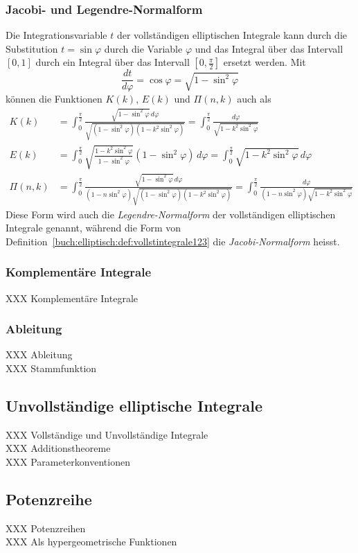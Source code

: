 \subsubsection{Jacobi- und Legendre-Normalform}
Die Integrationsvariable $t$ der vollständigen elliptischen Integrale
kann durch die Substitution $t=\sin\varphi$ durch die Variable
$\varphi$ und das Integral über das Intervall $[0,1]$ durch ein
Integral über das Intervall $[0,\frac{\pi}2]$ ersetzt werden.
Mit
\[
\frac{dt}{d\varphi} = \cos\varphi = \sqrt{1-\sin^2\varphi}
\]
können die Funktionen $K(k)$, $E(k)$ und $\Pi(n,k)$ auch als
\begin{align*}
K(k)
&=
\int_0^{\frac{\pi}2}
\frac{
\sqrt{1-\sin^2\varphi}\,d\varphi
}{
\sqrt{(1-\sin^2\varphi)(1-k^2\sin^2\varphi)}
}
=
\int_0^{\frac{\pi}2}
\frac{d\varphi}{\sqrt{1-k^2\sin^2\varphi}}
\\
E(k)
&=
\int_0^{\frac{\pi}2}
\sqrt{\frac{1-k^2\sin^2\varphi}{1-\sin^2\varphi}}(1-\sin^2\varphi)\,d\varphi
=
\int_0^{\frac{\pi}2}
\sqrt{1-k^2\sin^2\varphi}\,d\varphi
\\
\Pi(n,k)
&=
\int_0^{\frac{\pi}2}
\frac{
\sqrt{1-\sin^2\varphi}\,d\varphi
}{
(1-n\sin^2\varphi)\sqrt{(1-\sin^2\varphi)(1-k^2\sin^2\varphi)}
}
=
\int_0^{\frac{\pi}2}
\frac{
d\varphi
}{
(1-n\sin^2\varphi)\sqrt{1-k^2\sin^2\varphi}
}
\end{align*}
Diese Form wird auch die {\em Legendre-Normalform} der vollständigen 
%
elliptischen Integrale genannt, während die Form von
Definition~\ref{buch:elliptisch:def:vollstintegrale123}
die {\em Jacobi-Normalform} heisst.
%


\subsubsection{Komplementäre Integrale}
XXX Komplementäre Integrale \\

\subsubsection{Ableitung}
XXX Ableitung \\
XXX Stammfunktion \\

\subsection{Unvollständige elliptische Integrale}
XXX Vollständige und Unvollständige Integrale \\
XXX Additionstheoreme \\
XXX Parameterkonventionen \\

\subsection{Potenzreihe}
XXX Potenzreihen \\
XXX Als hypergeometrische Funktionen \\


